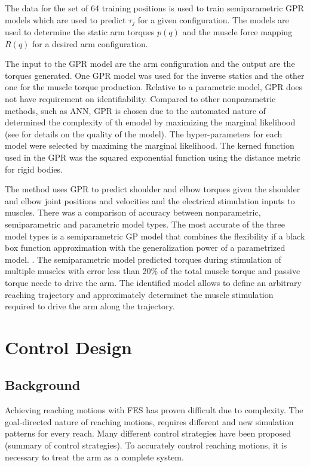 The data for the set of 64 training positions is used to train semiparametric GPR models which are used to predict $\tau_j$ for a given configuration. The models are used to determine the static arm torques $p(q)$ and the muscle force mapping $R(q)$ for a desired arm configuration.

The input to the GPR model are the arm configuration and the output are the torques generated. One GPR model was used for the inverse statics and the other one for the muscle torque production. 
Relative to a parametric model, GPR does not have requirement on identifiability. Compared to other nonparametric methods, such as ANN, GPR is chosen due to the automated nature of determined the complexity of th emodel by maximizing the marginal likelihood (see \cite{SPI} for details on the quality of the model). The hyper-parameters for each model were selected by maximing the marginal likelihood. The kerned function used in the GPR was the squared exponential function using the distance metric for rigid bodies. 

The method uses GPR to predict shoulder and elbow torques given the shoulder and elbow joint positions and velocities and the electrical stimulation inputs to muscles. There was a comparison of accuracy between nonparametric, semiparametric and parametric model types. The most accurate of the three model types is a semiparametric GP model that combines the flexibility if a black box function approximation with the generalization power of a parametrized model. \cite{SPI}. The semiparametric model predicted torques during stimulation of multiple muscles with error less than 20\% of the total muscle torque and passive torque neede to drive the arm. The identified model allows to define an arbitrary reaching trajectory and approximately determinet the muscle stimulation required to drive the arm along the trajectory. 


\section{Control Design}
\subsection{Background}
Achieving reaching motions with FES has proven difficult due to complexity. The goal-directed nature of reaching motions, requires different and new simulation patterns for every reach. Many different control strategies have been proposed (summary of control strategies). To accurately control reaching motions, it is necessary to treat the arm as a complete system. 





